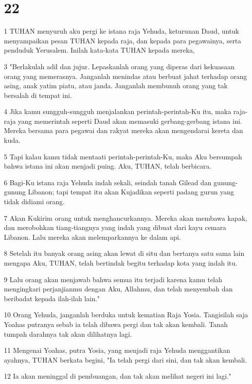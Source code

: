 \chapter{22}

\par 1 TUHAN menyuruh aku pergi ke istana raja Yehuda, keturunan Daud, untuk menyampaikan pesan TUHAN kepada raja, dan kepada para pegawainya, serta penduduk Yerusalem. Inilah kata-kata TUHAN kepada mereka,
\par 3 "Berlakulah adil dan jujur. Lepaskanlah orang yang diperas dari kekuasaan orang yang memerasnya. Janganlah menindas atau berbuat jahat terhadap orang asing, anak yatim piatu, atau janda. Janganlah membunuh orang yang tak bersalah di tempat ini.
\par 4 Jika kamu sungguh-sungguh menjalankan perintah-perintah-Ku itu, maka raja-raja yang memerintah seperti Daud akan memasuki gerbang-gerbang istana ini. Mereka bersama para pegawai dan rakyat mereka akan mengendarai kereta dan kuda.
\par 5 Tapi kalau kamu tidak mentaati perintah-perintah-Ku, maka Aku bersumpah bahwa istana ini akan menjadi puing. Aku, TUHAN, telah berbicara.
\par 6 Bagi-Ku istana raja Yehuda indah sekali, seindah tanah Gilead dan gunung-gunung Libanon; tapi tempat itu akan Kujadikan seperti padang gurun yang tidak didiami orang.
\par 7 Akan Kukirim orang untuk menghancurkannya. Mereka akan membawa kapak, dan merobohkan tiang-tiangnya yang indah yang dibuat dari kayu cemara Libanon. Lalu mereka akan melemparkannya ke dalam api.
\par 8 Setelah itu banyak orang asing akan lewat di situ dan bertanya satu sama lain mengapa Aku, TUHAN, telah bertindak begitu terhadap kota yang indah itu.
\par 9 Lalu orang akan menjawab bahwa semua itu terjadi karena kamu telah mengingkari perjanjianmu dengan Aku, Allahmu, dan telah menyembah dan beribadat kepada ilah-ilah lain."
\par 10 Orang Yehuda, janganlah berduka untuk kematian Raja Yosia. Tangisilah saja Yoahas putranya sebab ia telah dibawa pergi dan tak akan kembali. Tanah tumpah darahnya tak akan dilihatnya lagi.
\par 11 Mengenai Yoahas, putra Yosia, yang menjadi raja Yehuda menggantikan ayahnya, TUHAN berkata begini, "Ia telah pergi dari sini, dan tak akan kembali.
\par 12 Ia akan meninggal di pembuangan, dan tak akan melihat negeri ini lagi."
